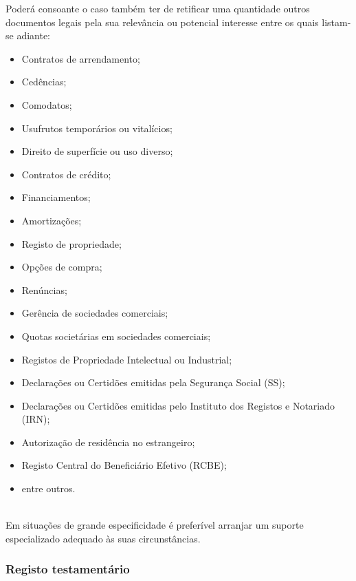 Poderá consoante o caso também ter de retificar uma quantidade outros
documentos legais pela sua relevância ou potencial interesse entre os
quais listam-se adiante:
\begin{itemize}
	\item Contratos de arrendamento;
	\item Cedências;
	\item Comodatos;
	\item Usufrutos temporários ou vitalícios;
	\item Direito de superfície ou uso diverso;
	\item Contratos de crédito;
	\item Financiamentos;
	\item Amortizações;
	\item Registo de propriedade;
	\item Opções de compra;
	\item Renúncias;
	\item Gerência de sociedades comerciais;
	\item Quotas societárias em sociedades comerciais;
	\item Registos de Propriedade Intelectual ou Industrial;
	\item Declarações ou Certidões emitidas pela Segurança Social (SS);
	\item Declarações ou Certidões emitidas pelo Instituto dos Registos e Notariado (IRN);
	\item Autorização de residência no estrangeiro;
	\item Registo Central do Beneficiário Efetivo (RCBE);
	\item entre outros.
\end{itemize}
\leavevmode\\
Em situações de grande especificidade é preferível arranjar um suporte
especializado adequado às suas circunstâncias.

\subsubsection{Registo testamentário}

